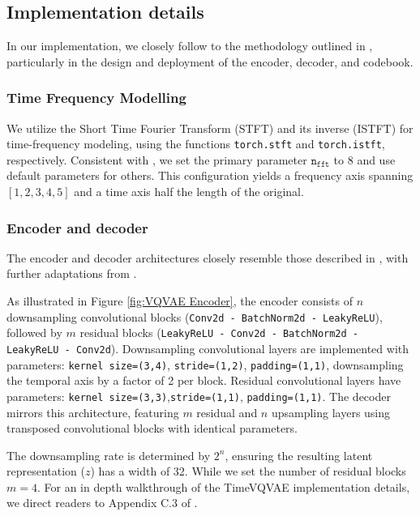 \documentclass[../../thesis.tex]{subfiles}
\begin{document}
\subsection{Implementation details}

In our implementation, we closely follow to the methodology outlined in \cite{TimeVQVAE}, particularly in the design and deployment of the encoder, decoder, and codebook.

\subsubsection{Time Frequency Modelling}
We utilize the Short Time Fourier Transform (STFT) and its inverse (ISTFT) for time-frequency modeling, using the functions \texttt{torch.stft} and \texttt{torch.istft}, respectively. Consistent with \cite{TimeVQVAE}, we set the primary parameter $\texttt{n}_{\texttt{fft}}$ to 8 and use default parameters for others. This configuration yields a frequency axis spanning $[1, 2, 3, 4, 5]$ and a time axis half the length of the original.

\subsubsection{Encoder and decoder}

The encoder and decoder architectures closely resemble those described in \cite{nadavbh12}, with further adaptations from \cite{TimeVQVAE}.\newline

As illustrated in Figure \ref{fig:VQVAE Encoder}, the encoder consists of $n$ downsampling convolutional blocks (\texttt{Conv2d - BatchNorm2d - LeakyReLU}), followed by $m$ residual blocks (\texttt{LeakyReLU - Conv2d - BatchNorm2d - LeakyReLU - Conv2d}). Downsampling convolutional layers are implemented with parameters: \texttt{kernel size=(3,4)}, \texttt{stride=(1,2)}, \texttt{padding=(1,1)}, downsampling the temporal axis by a factor of 2 per block. Residual convolutional layers have parameters: \texttt{kernel size=(3,3)},\texttt{stride=(1,1)}, \texttt{padding=(1,1)}. The decoder mirrors this architecture, featuring $m$ residual and $n$ upsampling layers using transposed convolutional blocks with identical parameters.\newline

The downsampling rate is determined by $2^n$, ensuring the resulting latent representation ($z$) has a width of 32. While we set the number of residual blocks $m = 4$. For an in depth walkthrough of the TimeVQVAE implementation details, we direct readers to Appendix C.3 of \cite{TimeVQVAE}.\newline
\end{document}
